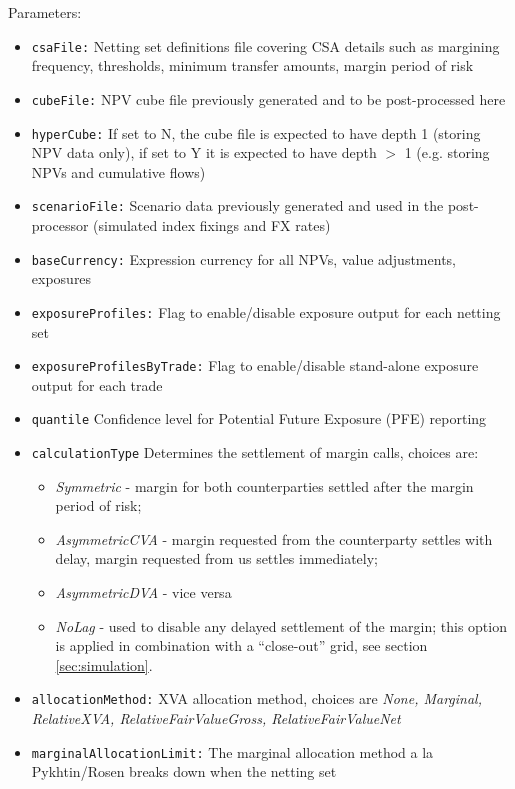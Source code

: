 \documentclass[12pt, a4paper]{article}
\begin{document}
{Parameters:
\begin{itemize}
\item {\tt csaFile:} Netting set definitions file covering CSA details such as margining frequency, thresholds, minimum
transfer amounts, margin period of risk
\item {\tt cubeFile:} NPV cube file previously generated and to be post-processed here
\item {\tt hyperCube:} If set to N, the cube file is expected to have depth 1 (storing NPV data only), if set to Y it is
expected to have depth $>$ 1 (e.g. storing NPVs and cumulative flows)
\item {\tt scenarioFile:} Scenario data previously generated and used in the post-processor (simulated index fixings and
FX rates)
\item {\tt baseCurrency:} Expression currency for all NPVs, value adjustments, exposures
\item {\tt exposureProfiles:} Flag to enable/disable exposure output for each netting set
\item {\tt exposureProfilesByTrade:} Flag to enable/disable stand-alone exposure output for each trade
\item {\tt quantile} Confidence level for Potential Future Exposure (PFE) reporting
\item {\tt calculationType} Determines the settlement of margin calls, choices are: \\
	\begin{itemize}
	\item {\em Symmetric} - margin for both counterparties settled after the margin period of risk; 
	\item {\em AsymmetricCVA} - margin requested from the counterparty settles with delay,
	margin requested from us settles immediately; 
	\item {\em AsymmetricDVA} - vice versa 
	\item {\em NoLag} - used to disable any delayed settlement of the margin; this option is applied in combination with a ``close-out'' grid, see section \ref{sec:simulation}. 
	\end{itemize}
\item {\tt allocationMethod:} XVA allocation method, choices are {\em None, Marginal, RelativeXVA, RelativeFairValueGross, RelativeFairValueNet}
\item {\tt marginalAllocationLimit:} The marginal allocation method a la Pykhtin/Rosen breaks down when the netting set

\end{itemize}}
\end{document}
